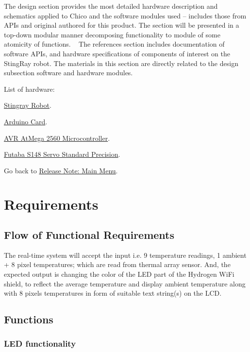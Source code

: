  The design section provides the most detailed hardware description and schematics applied to Chico and the software modules used – includes those from A\+P\+Is and original authored for this product. The section will be presented in a top-\/down modular manner decomposing functionality to module of some atomicity of functions. ~\newline
 The references section includes documentation of software A\+P\+Is, and hardware specifications of components of interest on the Sting\+Ray robot. The materials in this section are directly related to the design subsection software and hardware modules.

List of hardware\+:
\begin{DoxyItemize}
\item \hyperlink{hardware_design_stingray}{Stingray Robot}.
\item \hyperlink{hardware_design_arduino}{Arduino Card}.
\item \hyperlink{hardware_design_avr}{A\+VR At\+Mega 2560 Microcontroller}.
\item \hyperlink{hardware_design_servo}{Futaba S148 Servo Standard Precision}.
\end{DoxyItemize}

Go back to \hyperlink{product_release_main_page}{Release Note\+: Main Menu}. \hypertarget{requirements}{}\section{Requirements}\label{requirements}
\hypertarget{requirements_flow}{}\subsection{Flow of Functional Requirements}\label{requirements_flow}
The real-\/time system will accept the input i.\+e. 9 temperature readings, 1 ambient + 8 pixel temperatures; which are read from thermal array sensor. And, the expected output is changing the color of the L\+ED part of the Hydrogen Wi\+Fi shield, to reflect the average temperature and display ambient temperature along with 8 pixels temperatures in form of suitable text string(s) on the L\+CD.\hypertarget{requirements_functions}{}\subsection{Functions}\label{requirements_functions}
\hypertarget{requirements_led}{}\subsubsection{L\+E\+D functionality}\label{requirements_led}

